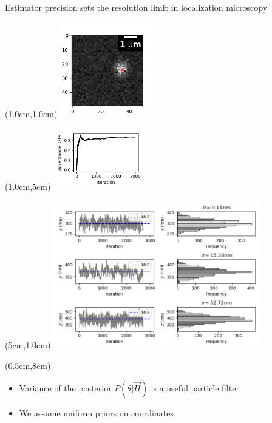 \documentclass{beamer}					%
\begin{document}
\begin{frame}{Estimator precision sets the resolution limit in localization microscopy}
\begin{textblock*}{4cm}(1.0cm,1.0cm)
\includegraphics[width=4cm]{MCMC/Figure_1.png}
\end{textblock*}
\begin{textblock*}{4cm}(1.0cm,5cm)
\includegraphics[width=4cm]{MCMC/Figure_2.png}
\end{textblock*}
\begin{textblock*}{9cm}(5cm,1.0cm)
\includegraphics[width=9cm]{MCMC/Figure_3.png}
\end{textblock*}
\begin{textblock*}{13cm}(0.5cm,8cm)
\begin{itemize}
\item Variance of the posterior $P(\theta|\vec{H})$ is a useful particle filter
\item We assume uniform priors on coordinates
\end{itemize}
\end{textblock*}
\end{frame}
\end{document}
